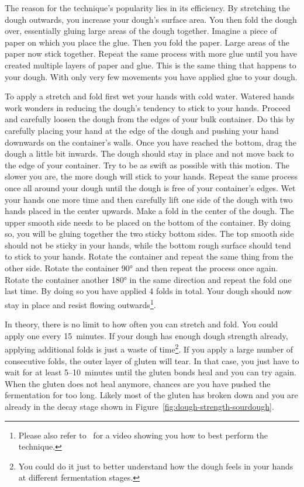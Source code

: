 The reason for the technique's popularity lies in its efficiency. By stretching
the dough outwards, you increase your dough's surface area. You then fold the
dough over, essentially gluing large areas of the dough together. Imagine a
piece of paper on which you place the glue. Then you fold the paper. Large areas
of the paper now stick together. Repeat the same process with more glue until
you have created multiple layers of paper and glue. This is the same thing that
happens to your dough. With only very few movements you have applied glue to your
dough.

To apply a stretch and fold first wet your hands with cold water. Watered hands
work wonders in reducing the dough's tendency to stick to your hands. Proceed and
carefully loosen the dough from the edges of your bulk container. Do this by
carefully placing your hand at the edge of the dough and pushing your hand
downwards on the container's walls. Once you have reached the bottom, drag the dough
a little bit inwards. The dough should stay in place and not move back to the
edge of your container. Try to be as swift as possible with this motion. The
slower you are, the more dough will stick to your hands. Repeat the same process
once all around your dough until the dough is free of your container's edges.
Wet your hands one more time and then carefully lift one side of the dough with
two hands placed in the center upwards. Make a fold in the center of the dough.
The upper smooth side needs to be placed on the bottom of the container. By doing
so, you will be gluing together the two sticky bottom sides. The top smooth side should
not be sticky in your hands, while the bottom rough surface should tend
to stick to your hands. Rotate the container
and repeat the same thing from the other side. Rotate the container 90°
and then repeat the process once again. Rotate the container another 180° in
the same direction
and repeat the fold one last time. By doing so you have applied 4 folds in total. Your
dough should now stay in place and resist flowing outwards\footnote{Please
also refer to~\cite{stretch+and+fold+technique} for a video showing you how to
best perform the technique.}.

In theory, there is no limit to how often you can stretch and fold. You could
apply one every 15~minutes. If your dough has enough dough strength already,
applying additional folds is just a waste of time\footnote{You could do it
just to better understand how the dough feels in your hands at different
fermentation stages.}. If you apply a large number of consecutive folds, the
outer layer of gluten
will tear. In that case, you just have to wait for at least 5--10~minutes until
the gluten bonds heal and you can try again. When the gluten does not heal
anymore, chances are you have pushed the fermentation for too long. Likely
most of the gluten has broken down and you are already
in the decay stage shown in Figure~\ref{fig:dough-strength-sourdough}.

